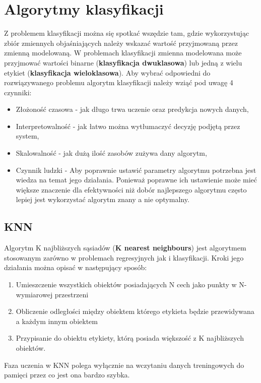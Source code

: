\section{Algorytmy klasyfikacji}
Z problemem klasyfikacji można się spotkać wszędzie tam, gdzie wykorzystując
zbiór zmiennych objaśniających należy wskazać wartość przyjmowaną przez zmienną
modelowaną. W problemach klasyfikacji zmienna modelowana może przyjmować wartości
binarne (\textbf{klasyfikacja dwuklasowa}) lub jedną z wielu etykiet (\textbf{klasyfikacja wieloklasowa}).
Aby wybrać odpowiedni do rozwiązywanego problemu algorytm klasyfikacji należy wziąć 
pod uwagę 4 czynniki:
\begin{itemize}
    \item Złożoność czasowa - jak długo trwa uczenie oraz predykcja nowych danych,
    \item Interpretowalność - jak łatwo można wytłumaczyć decyzję podjętą przez 
    system,
    \item Skalowalność - jak dużą ilość zasobów zużywa dany algorytm,
    \item Czynnik ludzki - Aby poprawnie ustawić parametry algorytmu potrzebna
    jest wiedza na temat jego działania. Ponieważ poprawne ich ustawienie może 
    mieć większe znaczenie dla efektywności niż dobór najlepszego algorytmu często
    lepiej jest wykorzystać algorytm znany a nie optymalny.
\end{itemize}

\subsection{KNN}

Algorytm K najbliższych sąsiadów (\textbf{K nearest neighbours}) jest algorytmem
stosowanym zarówno w problemach regresyjnych jak i klasyfikacji. Kroki jego działania
można opisać w następujący sposób:
\begin{enumerate}
    \item Umieszczenie wszystkich obiektów posiadających N cech jako punkty w N-wymiarowej przestrzeni
    \item Obliczenie odległości między obiektem którego etykieta będzie przewidywana a każdym innym
    obiektem
    \item Przypisanie do obiektu etykiety, którą posiada większość z K najbliższych obiektów. 
\end{enumerate}
Faza uczenia w KNN polega wyłącznie na wczytaniu danych treningowych do pamięci przez co jest 
ona bardzo szybka.

